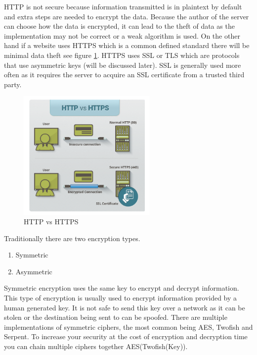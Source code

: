 HTTP is not secure because information transmitted is in plaintext by default and extra steps are needed to encrypt the data. Because the author of the server can choose how the data is encrypted, it can lead to the theft of data as the implementation may not be correct or a weak algorithm is used.
On the other hand if a website uses HTTPS which is a common defined standard there will be minimal data theft see figure \ref{fig:https1}. HTTPS uses SSL or TLS which are protocols that use asymmetric keys (will be discussed later). SSL is generally used more often as it requires the server to acquire an SSL certificate from a trusted third party.

\begin{figure}[ht]
  \centering
      \includegraphics[width=0.6\textwidth]{Figures/httpsVsHttp.png}
  \caption[HTTP vs HTTPS]{HTTP vs HTTPS\cite{https1}}
  \label{fig:https1}
\end{figure}



Traditionally there are two encryption types.
\begin{enumerate}
    \item Symmetric
    \item Asymmetric
\end{enumerate}

Symmetric encryption uses the same key to encrypt and decrypt information. This type of encryption is usually used to encrypt information provided by a human generated key. It is not safe to send this key over a network as it can be stolen or the destination being sent to can be spoofed. There are multiple implementations of symmetric ciphers, the most common being AES, Twofish and Serpent. To increase your security at the cost of encryption and decryption time you can chain multiple ciphers together AES(Twofish(Key)).

